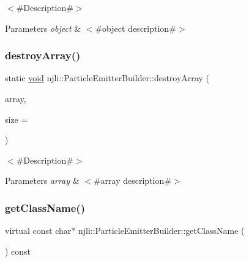 $<$\#\+Description\#$>$


\begin{DoxyParams}{Parameters}
{\em object} & $<$\#object description\#$>$ \\
\hline
\end{DoxyParams}
\mbox{\label{classnjli_1_1_particle_emitter_builder_ac8289944f7f62b9e94e9952a1c985691}} 
\subsubsection{\texorpdfstring{destroy\+Array()}{destroyArray()}}
{\footnotesize\ttfamily static \mbox{\hyperlink{_thread_8h_af1e856da2e658414cb2456cb6f7ebc66}{void}} njli\+::\+Particle\+Emitter\+Builder\+::destroy\+Array (\begin{DoxyParamCaption}\item[{\mbox{\hyperlink{classnjli_1_1_particle_emitter_builder}{Particle\+Emitter\+Builder}} $\ast$$\ast$}]{array,  }\item[{const \mbox{\hyperlink{_util_8h_a10e94b422ef0c20dcdec20d31a1f5049}{u32}}}]{size = {} }\end{DoxyParamCaption})\hspace{0.3cm}{\ttfamily [static]}}

$<$\#\+Description\#$>$


\begin{DoxyParams}{Parameters}
{\em array} & $<$\#array description\#$>$ \\
\hline
\end{DoxyParams}
\mbox{\label{classnjli_1_1_particle_emitter_builder_abb18fe669921fb43309d7bd8e2c52374}} 
\subsubsection{\texorpdfstring{get\+Class\+Name()}{getClassName()}}
{\footnotesize\ttfamily virtual const char$\ast$ njli\+::\+Particle\+Emitter\+Builder\+::get\+Class\+Name (\begin{DoxyParamCaption}{ }\end{DoxyParamCaption}) const\hspace{0.3cm}{\ttfamily [virtual]}}

